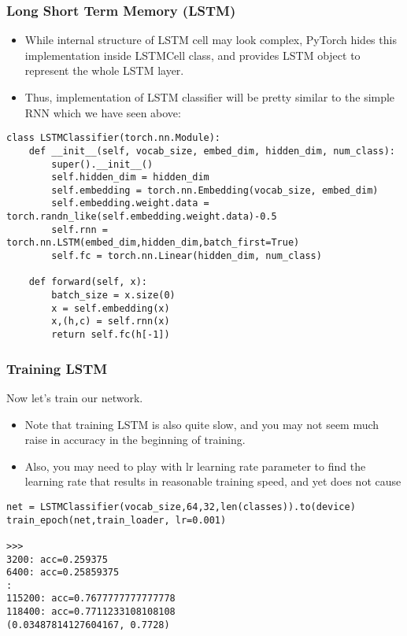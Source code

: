 \begin{frame}[fragile] \frametitle{Long Short Term Memory (LSTM)}


\begin{itemize}
\item While internal structure of LSTM cell may look complex, PyTorch hides this implementation inside LSTMCell class, and provides LSTM object to represent the whole LSTM layer. 
\item Thus, implementation of LSTM classifier will be pretty similar to the simple RNN which we have seen above:

\end{itemize}

\begin{lstlisting}
class LSTMClassifier(torch.nn.Module):
    def __init__(self, vocab_size, embed_dim, hidden_dim, num_class):
        super().__init__()
        self.hidden_dim = hidden_dim
        self.embedding = torch.nn.Embedding(vocab_size, embed_dim)
        self.embedding.weight.data = torch.randn_like(self.embedding.weight.data)-0.5
        self.rnn = torch.nn.LSTM(embed_dim,hidden_dim,batch_first=True)
        self.fc = torch.nn.Linear(hidden_dim, num_class)

    def forward(self, x):
        batch_size = x.size(0)
        x = self.embedding(x)
        x,(h,c) = self.rnn(x)
        return self.fc(h[-1])
\end{lstlisting}

\end{frame}

\begin{frame}[fragile] \frametitle{Training LSTM}

Now let's train our network. 

\begin{itemize}
\item Note that training LSTM is also quite slow, and you may not seem much raise in accuracy in the beginning of training. 
\item Also, you may need to play with lr learning rate parameter to find the learning rate that results in reasonable training speed, and yet does not cause

\end{itemize}

\begin{lstlisting}
net = LSTMClassifier(vocab_size,64,32,len(classes)).to(device)
train_epoch(net,train_loader, lr=0.001)

>>>
3200: acc=0.259375
6400: acc=0.25859375
:
115200: acc=0.7677777777777778
118400: acc=0.7711233108108108
(0.03487814127604167, 0.7728)
\end{lstlisting}

\end{frame}


